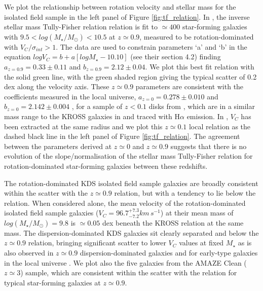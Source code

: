 \documentclass[fleqn,usenatbib]{mnras}
\begin{document}
\noindent
We plot the relationship between rotation velocity and stellar mass for the isolated field sample in the left panel of Figure \ref{fig:tf_relation}.
In \cite{Harrison2017}, the inverse stellar mass Tully-Fisher relation relation is fit to $\simeq400$ star-forming galaxies with $9.5 < log(M_{\star}/M_{\odot}) < 10.5$ at $z\simeq0.9$, measured to be rotation-dominated with $V_{C}/\sigma_{int} > 1$.
The data are used to constrain parameters `a' and `b' in the equation $logV_{C}=b+a[logM_{\star} - 10.10]$ (see their section 4.2) finding $a_{z=0.9} = 0.33 \pm 0.11$ and $b_{z=0.9} = 2.12 \pm 0.04$.
We plot this best fit relation with the solid green line, with the green shaded region giving the typical scatter of 0.2 dex along the velocity axis.
These $z\simeq0.9$ parameters are consistent with the coefficients measured in the local universe, $a_{z=0} = 0.278 \pm 0.010$ and $b_{z=0} = 2.142 \pm 0.004$ , for a sample of $z<0.1$ disks from \cite{Reyes2011}, which are in a similar mass range to the KROSS galaxies in \cite{Harrison2017} and traced with H$\alpha$ emission.
In \cite{Reyes2011}, $V_{C}$ has been extracted at the same radius and we plot this $z\simeq0.1$ local relation as the dashed black line in the left panel of Figure \ref{fig:tf_relation}.
The agreement between the parameters derived at $z\simeq0$ and $z\simeq0.9$ suggests that there is no evolution of the slope/normalisation of the stellar mass Tully-Fisher relation for rotation-dominated star-forming galaxies between these redshifts. 

The rotation-dominated KDS isolated field sample galaxies are broadly consistent within the scatter with the $z\simeq0.9$ relation, but with a tendency to lie below the relation.
When considered alone, the mean velocity of the rotation-dominated isolated field sample galaxies ($V_{C} = 96.7^{+7.3}_{-7.2}km\,s^{-1}$) at their mean mass of $log(M_{\star}/M_{\odot})=9.8$ is $\simeq0.05$ dex beneath the KROSS relation at the same mass.
The dispersion-dominated KDS galaxies sit clearly separated and below the $z\simeq0.9$ relation, bringing significant scatter to lower $V_{C}$ values at fixed $M_{\star}$ as is also observed in $z\simeq0.9$ dispersion-dominated galaxies and for early-type galaxies in the local universe \citep[e.g.][]{Romanowsky2012}. 
We plot also the five galaxies from the AMAZE Clean ($z\simeq3$) sample, which are consistent within the scatter with the relation for typical star-forming galaxies at $z\simeq0.9$. \\
\end{document}
